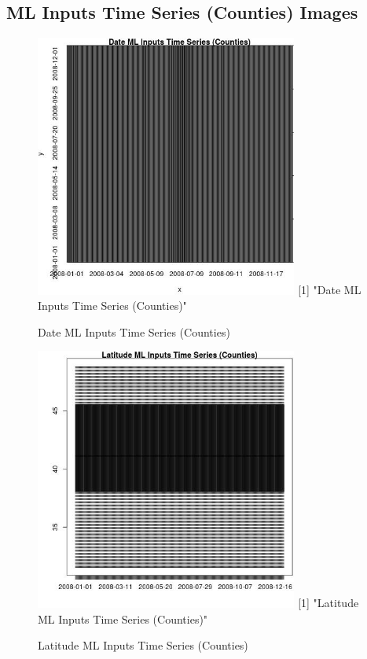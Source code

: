
\subsection{ML Inputs Time Series (Counties) Images} 
 

\begin{figure} 
\centering  
\includegraphics[width=0.77\textwidth]{Code_Outputs/ML_input_report_ML_input_CountyGeometricCentroids_Locations_Dates_part_c_2008-01-01to2008-12-31_DateTS.jpg} 
[1] "Date ML Inputs Time Series (Counties)"
\caption{\label{fig:ML_input_report_ML_input_CountyGeometricCentroids_Locations_Dates_part_c_2008-01-01to2008-12-31DateTS}Date ML Inputs Time Series (Counties)} 
\end{figure} 
 

\begin{figure} 
\centering  
\includegraphics[width=0.77\textwidth]{Code_Outputs/ML_input_report_ML_input_CountyGeometricCentroids_Locations_Dates_part_c_2008-01-01to2008-12-31_LatitudeTS.jpg} 
[1] "Latitude ML Inputs Time Series (Counties)"
\caption{\label{fig:ML_input_report_ML_input_CountyGeometricCentroids_Locations_Dates_part_c_2008-01-01to2008-12-31LatitudeTS}Latitude ML Inputs Time Series (Counties)} 
\end{figure} 
 

